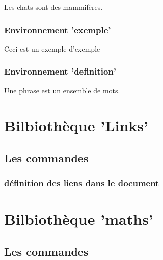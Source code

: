 \begin{remarque}
Les chats sont des mammifères.
\end{remarque}

\subsection{Environnement 'exemple' }

\begin{exemple}
Ceci est un exemple d'exemple
\end{exemple}

\subsection{Environnement 'definition' }

\begin{definition}
Une phrase est un ensemble de mots.
\end{definition}



\chapter{Bilbiothèque 'Links'}


\section{Les commandes}


\subsection{définition des liens dans le document}




\chapter{Bilbiothèque 'maths'}


\section{Les commandes}


